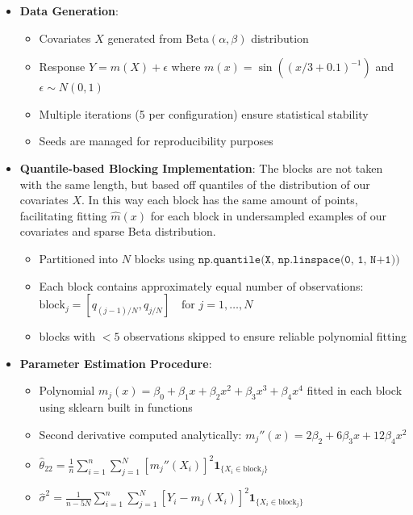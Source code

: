 \documentclass{article}
\begin{document}
\begin{itemize}
    \item \textbf{Data Generation}:
    \begin{itemize}
        \item Covariates $X$ generated from Beta$(\alpha, \beta)$ distribution
        \item Response $Y = m(X) + \epsilon$ where $m(x) = \sin\left((x/3 + 0.1)^{-1}\right)$ and $\epsilon \sim N(0,1)$
        \item Multiple iterations (5 per configuration) ensure statistical stability
        \item Seeds are managed for reproducibility purposes
    \end{itemize}
    
    \item \textbf{Quantile-based Blocking Implementation}:
    The blocks are not taken with the same length, but based off quantiles of the distribution of our covariates $X$. 
    In this way each block has the same amount of points, facilitating fitting $\hat{m}(x)$ for each block in undersampled examples of our covariates and sparse Beta distribution.
    \begin{itemize}
        \item Partitioned into $N$ blocks using $\texttt{np.quantile(X, np.linspace(0, 1, N+1))}$
        \item Each block contains approximately equal number of observations: $\text{block}_j = [q_{(j-1)/N}, q_{j/N}] \quad \text{for } j=1,\dots,N$
        \item blocks with $<5$ observations skipped to ensure reliable polynomial fitting
    \end{itemize}
    
    \item \textbf{Parameter Estimation Procedure}:
    \begin{itemize}
        \item Polynomial $m_j(x) = \beta_0 + \beta_1x + \beta_2x^2 + \beta_3x^3 + \beta_4x^4$ fitted in each block using sklearn built in functions
        \item Second derivative computed analytically: $m_j''(x) = 2\beta_2 + 6\beta_3x + 12\beta_4x^2$
        \item $\hat{\theta}_{22} = \frac{1}{n}\sum_{i=1}^n \sum_{j=1}^N [m_j''(X_i)]^2 \mathbf{1}_{\{X_i \in \text{block}_j\}}$
        \item $\hat{\sigma}^2 = \frac{1}{n-5N}\sum_{i=1}^n \sum_{j=1}^N [Y_i - m_j(X_i)]^2 \mathbf{1}_{\{X_i \in \text{block}_j\}}$
    \end{itemize}
    

\end{itemize}
\end{document}
